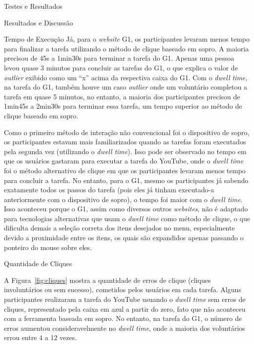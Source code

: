 \begin{chapter}{Testes e Resultados}
\begin{section}{Resultados e Discussão}
\begin{subsection}{Tempo de Execução}
Já, para o \textit{website} G1, os participantes levaram menos tempo
para finalizar a tarefa utilizando o método de clique baseado em sopro.
A maioria precisou de 45s a 1min30s para terminar a tarefa do G1. Apenas uma
pessoa levou quase 3 minutos para concluir as tarefas do G1, o que explica o
valor de \textit{outlier} exibido como um ``x'' acima da respectiva caixa do
G1. Com o \textit{dwell time}, na tarefa do G1, também houve um caso
\textit{outlier} onde um voluntário completou a tarefa em quase 5 minutos, no
entanto, a maioria dos participantes precisou de 1min45s a 2min30s para terminar
essa tarefa, um tempo superior ao método de clique baseado em sopro.

Como o primeiro método de interação não convencional foi o dispositivo de sopro,
os participantes estavam mais familiarizados quando as tarefas foram executados
pela segunda vez (utilizando o \textit{dwell time}). Isso pode ser observado no
tempo em que os usuários gastaram para executar a tarefa do YouTube, onde o
\textit{dwell time} foi o método alternativo de clique em que  os participantes
levaram menos tempo para concluir a tarefa. No entanto, para o G1, mesmo os
participantes já sabendo exatamente todos os passos do tarefa (pois eles já
tinham executado-a anteriormente com o dispositivo de sopro), o tempo foi maior
com o \textit{dwell time}. Isso aconteceu porque o G1, assim como diversos
outros \textit{websites}, não é adaptado para tecnologias alternativas que usam
o \textit{dwell time} como método de clique, o que dificulta demais a seleção
correta dos itens desejados no menu, especialmente devido a proximidade entre os
itens, os quais são expandidos apenas passando o ponteiro do mouse sobre eles.

\end{subsection}

\begin{subsection}{Quantidade de Cliques}

A Figura~\ref{fig:cliques} mostra a quantidade de erros de clique (cliques
involuntários ou sem sucesso), cometidos pelos usuários em cada tarefa. Alguns
participantes realizaram a tarefa do YouTube usuando o \textit{dwell time} sem
erros de cliques, representado pela caixa em azul a partir do zero, fato que não
aconteceu com a ferramenta baseada em sopro. No entanto, na tarefa do G1, o
número de erros aumentou consideravelmente no \textit{dwell time}, onde a
maioria dos voluntários errou entre 4 a 12 vezes.


\end{subsection}
\end{section}
\end{chapter}

